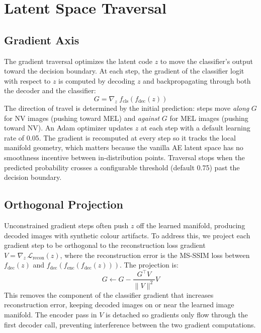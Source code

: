 \documentclass[conference,compsoc]{IEEEtran}
\begin{document}
\section{Latent Space Traversal}

\subsection{Gradient Axis}
\label{sec:gradient}

The gradient traversal optimizes the latent code $z$ to move the classifier's output toward the decision boundary. At each step, the gradient of the classifier logit with respect to $z$ is computed by decoding $z$ and backpropagating through both the decoder and the classifier:
\begin{equation}
    G = \nabla_z \; f_{\text{cls}}\!\left(f_{\text{dec}}(z)\right)
\end{equation}
The direction of travel is determined by the initial prediction: steps move \emph{along} $G$ for NV images (pushing toward MEL) and \emph{against} $G$ for MEL images (pushing toward NV). An Adam optimizer updates $z$ at each step with a default learning rate of 0.05. The gradient is recomputed at every step so it tracks the local manifold geometry, which matters because the vanilla AE latent space has no smoothness incentive between in-distribution points. Traversal stops when the predicted probability crosses a configurable threshold (default 0.75) past the decision boundary.

\subsection{Orthogonal Projection}
\label{sec:orthogonal}
Unconstrained gradient steps often push $z$ off the learned manifold, producing decoded images with synthetic colour artifacts. To address this, we project each gradient step to be orthogonal to the reconstruction loss gradient $V = \nabla_z \, \mathcal{L}_{\text{recon}}(z)$, where the reconstruction error is the MS-SSIM loss between $f_{\text{dec}}(z)$ and $f_{\text{dec}}(f_{\text{enc}}(f_{\text{dec}}(z)))$. The projection is:
\begin{equation}
 G \leftarrow G - \frac{G^\top V}{\|V\|^2} V   
\end{equation}
This removes the component of the classifier gradient that increases reconstruction error, keeping decoded images on or near the learned image manifold. The encoder pass in $V$ is detached so gradients only flow through the first decoder call, preventing interference between the two gradient computations.
\end{document}
